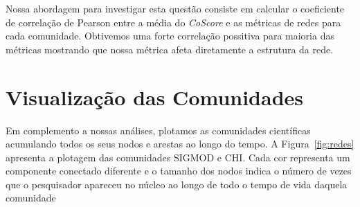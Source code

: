 \documentclass[12pt]{article}
\begin{document}
Nossa abordagem para investigar esta questão consiste em calcular o coeficiente de correlação de Pearson entre a média do
\textit{CoScore} e as métricas de redes para cada comunidade. Obtivemos uma forte correlação possitiva para maioria das métricas
mostrando que nossa métrica afeta diretamente a estrutura da rede.

\section{Visualização das Comunidades}

Em complemento a nossas análises, plotamos as comunidades científicas acumulando todos os seus nodos e arestas ao longo 
do tempo. A Figura~\ref{fig:redes} apresenta a plotagem das comunidades SIGMOD e CHI. Cada cor representa um 
componente conectado diferente e o tamanho dos nodos indica o número de vezes que o pesquisador apareceu no núcleo ao 
longo de todo o tempo de vida daquela comunidade
\end{document}
